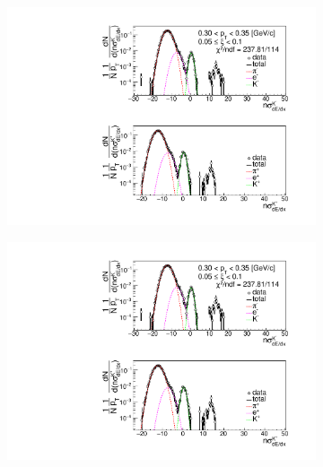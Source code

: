 \begin{figure}[h!]
\begin{subfigure}{.3\textwidth}
	\end{subfigure}
	\begin{subfigure}{.33\textwidth}
		\includegraphics[width=\linewidth, page=4]{chapters/chrgSTAR/img/dEdx/fit2019_thirdStep_1_1.pdf}
	\end{subfigure}
	\begin{subfigure}{.33\textwidth}
		\includegraphics[width=\linewidth, page=5]{chapters/chrgSTAR/img/dEdx/fit2019_thirdStep_1_1.pdf}
	\end{subfigure}
	\begin{subfigure}{.3\textwidth}

\end{subfigure}
\end{figure}
